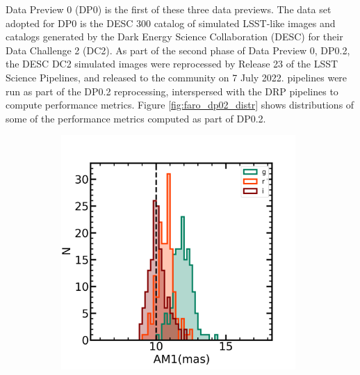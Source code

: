 Data Preview 0 (DP0) \cite{RTN-001} is the first of these three data previews.
The data set adopted for DP0 is the DESC 300 \degsq catalog of simulated LSST-like images and catalogs generated by the Dark Energy Science Collaboration (DESC) for their Data Challenge 2 (DC2)\cite{2021ApJS..253...31L}.
As part of the second phase of Data Preview 0, DP0.2, the DESC DC2 simulated images were reprocessed by Release 23 of the LSST Science Pipelines, and released to the community on 7 July 2022. 
\faro pipelines were run as part of the DP0.2 reprocessing, interspersed with the DRP pipelines to compute performance metrics. 
Figure \ref{fig:faro_dp02_distr} shows distributions of some of the performance metrics computed as part of DP0.2.
\begin{figure}[!htp]
\begin{subfigure}{.5\textwidth}
    \includegraphics[width=0.98\textwidth]{figures/dp02_am1_alltracts_gri}
\end{subfigure}%
\begin{subfigure}{.5\textwidth}

\end{subfigure}
\end{figure}
